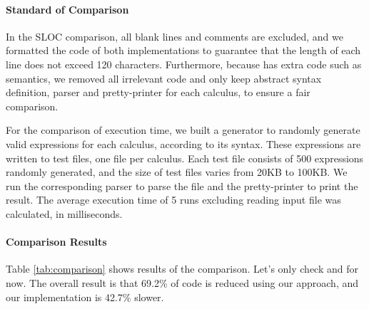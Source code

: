 \paragraph{Standard of Comparison}
In the SLOC comparison, all blank lines and comments are excluded,
and we formatted the code of both implementations to guarantee that
the length of each line does not exceed 120 characters. Furthermore,
because \ilyaimpl{} has extra code such as semantics,
we removed all irrelevant code and only keep abstract
syntax definition, parser and pretty-printer for each calculus, to
ensure a fair comparison.

For the comparison of execution time, we built a generator to randomly
generate valid expressions for each calculus, according to its syntax. These expressions are
written to test files, one file per calculus. Each test file consists of 500
expressions randomly generated, and the size of test files varies from 20KB to 100KB.
We run the corresponding parser to parse the file and the pretty-printer to print the result.
The average execution time of 5 runs excluding reading input file was calculated, in milliseconds.

\begin{table}
    \centering
    \caption{Comparison of SLOC and execution time.}
    \label{tab:comparison}
    \vspace{-0.3cm}
\end{table}

\paragraph{Comparison Results}
Table \ref{tab:comparison} shows results of the comparison.
Let's only check \ourimpl{} and \ilyaimpl{} for now.
The overall result is that 69.2\% of code is reduced using our
approach, and our implementation is 42.7\% slower.

